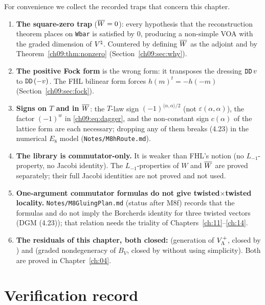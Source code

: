 For convenience we collect the recorded traps that concern this chapter.
\begin{enumerate}
\item \textbf{The square-zero trap} ($\overline{W}=0$): every hypothesis that the reconstruction
theorem places on \texttt{Wbar} is satisfied by $0$, producing a non-simple VOA with the graded
dimension of ${V^{\natural}}$. Countered by defining $\overline{W}$ as the adjoint and by
Theorem~\ref{ch09:thm:nonzero} (Section~\ref{ch09:sec:why}).
\item \textbf{The positive Fock form} is the wrong form: it transposes the dressing
$\lean{DD}\,v$ to $\lean{DD}\,(-v)$. The FHL bilinear form forces $h(m)^t=-h(-m)$
(Section~\ref{ch09:sec:fock}).
\item \textbf{Signs on $T$ and in $\overline{W}$}: the $T$-law sign $(-1)^{\langle\alpha,\alpha\rangle/2}$
(not $\varepsilon(\alpha,\alpha)$), the factor $(-1)^w$ in \eqref{ch09:eq:dagger}, and the non-constant
sign $c(\alpha)$ of the lattice form are each necessary; dropping any of them breaks (4.23) in the
numerical $E_8$ model (\texttt{Notes/M8hRoute.md}).
\item \textbf{The library  is commutator-only.} It is weaker than FHL's notion
(no $L_{-1}$-property, no Jacobi identity). The $L_{-1}$-properties of $W$ and $\overline{W}$ are proved
separately; their full Jacobi identities are not proved and not used.
\item \textbf{One-argument commutator formulas do not give twisted$\times$twisted locality.}
\texttt{Notes/M8GluingPlan.md} (status after M8f) records that the formulas
 and  do not imply the Borcherds identity for three twisted
vectors (DGM (4.23)); that relation needs the triality of Chapters~\ref{ch:11}--\ref{ch:14}.
\item \textbf{The residuals of this chapter, both closed:}  (generation of $V_{\Lambda}^{+}$,
closed by ) and  (graded nondegeneracy of $B_V$, closed by
 without using simplicity). Both are proved in Chapter~\ref{ch:04}.
\end{enumerate}

\section{Verification record}\label{ch09:sec:verification}

